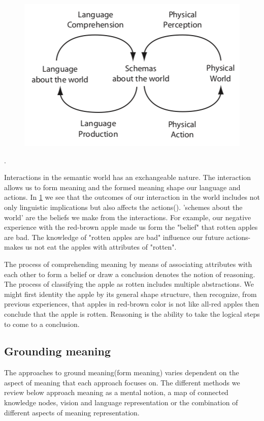\documentclass[11pt, a4paper]{article}
\begin{document}
\begin{figure}[H]
\centering
\includegraphics[scale=0.5]{images/symbolsyststem.png}
\caption{\cite{roy2005semiotic}}
\label{fig:roy}
\end{figure}.

Interactions in the semantic world  has an exchangeable nature. The interaction allows us to form meaning and the formed meaning shape our language and actions. In \ref{fig:roy} we see that the outcomes of our interaction in the world includes not only linguistic implications but also affects the actions(\cite{roy2005semiotic}). 'schemes about the world' are the beliefs we make from the interactions. For example, our negative experience with the red-brown apple made us form the  "belief" that rotten apples are bad. The knowledge of "rotten apples are bad" influence our future actions- makes us not eat the apples with attributes of "rotten". 

The process of comprehending meaning by means of associating attributes with each other to form a belief or draw a conclusion denotes the notion of reasoning. The process of classifying the apple as rotten includes multiple abstractions. We might first identity the apple by its general shape structure, then recognize, from previous experiences, that  apples in red-brown color is not like all-red apples then conclude that the apple is rotten. Reasoning is the ability to take the logical steps to come to a conclusion.  
 


\subsection{Grounding meaning}

The approaches to ground meaning(form meaning) varies dependent on the aspect of meaning that each approach focuses on. The different methods we review below approach meaning as a mental notion, a map of connected knowledge nodes,  vision and language representation or  the combination of different aspects of meaning representation. 
\end{document}
